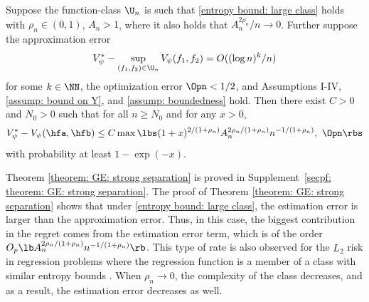 \documentclass[preprint] {imsart}
\begin{document}
\begin{theorem}\label{theorem: GE: strong separation}
Suppose the function-class $\U_n$  is such  that 
 \eqref{entropy bound: large class} holds with $\rho_n\in(0,1)$, $A_n> 1$, where it also holds that  ${A_n^{2\rho_n}}/{n}\to 0$.
 Further suppose
  the approximation error
\[V_{\psi}^*-\sup_{(f_1,f_2)\in\U_n}V_{\psi}(f_1,f_2)=O((\log n)^k/{n})\]
for some $k\in\NN$, the optimization error $\Opn<1/2$, and Assumptions I-IV, \ref{assump: bound on Y}, and \ref{assump: boundedness} hold. Then there exist $C>0$ and $N_0>0$ such that for all  $n\geq N_0$ and for any $x>0$,
\[V_{\psi}^*-V_{\psi}(\hfa,\hfb)\leq  C\max\lbs (1+x)^{2/(1+\rho_n)} {A_n^{2\rho_n/(1+\rho_n)}}{n^{-1/(1+\rho_n)}},\ \Opn\rbs\]
with probability at least $1-\exp(-x)$.
\end{theorem}
Theorem \ref{theorem: GE: strong separation} is proved in Supplement~\ref{secpf: theorem: GE: strong separation}.
The proof of Theorem \ref{theorem: GE: strong separation} shows that under  \eqref{entropy bound: large class}, the estimation error is larger than the approximation error.   Thus, in this case, the biggest contribution in the regret comes from the estimation error  term, which is of the order $O_p\lb A_n^{2\rho_n/(1+\rho_n)}n^{-1/(1+\rho_n)}\rb$.
This type of rate is also observed for the $L_2$ risk in  regression problems where the regression function is a member of a class with similar entropy bounds \citep[p. 75, Example 4,][]{koltchinskii2009}. 
When $\rho_n\to 0$, the complexity of the class decreases, and as a result, the estimation error decreases as well. 
\end{document}

